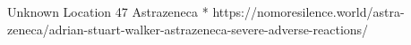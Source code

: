           {Unknown Location}
          {47}
          {Astrazeneca}
          {*}
          {
          }
          {https://nomoresilence.world/astra-zeneca/adrian-stuart-walker-astrazeneca-severe-adverse-reactions/}

